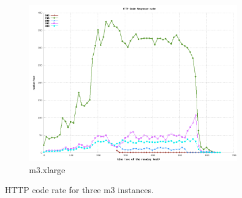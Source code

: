 \documentclass[dvips,12pt]{article}
\begin{document}
\begin{figure}[h!]
\begin{subfigure}[b]{0.3\textwidth}
        \includegraphics[width=\textwidth]{images/http_code_xlarge.png}
        \caption{m3.xlarge}
    \end{subfigure}
    \caption{HTTP code rate for three m3 instances.}
\end{figure}
\end{document}
